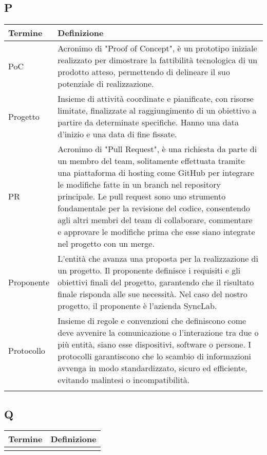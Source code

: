 \documentclass[10pt]{article}
\begin{document}
\subsection{P} %
\begin{tabularx}{\textwidth}{|>{\centering\arraybackslash}l|X|}
\hline
\rowcolor[gray]{0.8}
\textbf{Termine} & \textbf{Definizione}\\
\hline
PoC & Acronimo di "Proof of Concept", è un prototipo iniziale realizzato per dimostrare la fattibilità tecnologica di un prodotto atteso, permettendo di delineare il suo potenziale di realizzazione.\\
\hline
Progetto & Insieme di attività coordinate e pianificate, con risorse limitate, finalizzate al raggiungimento di un obiettivo a partire da determinate specifiche. Hanno una data d'inizio e una data di fine fissate.\\
\hline
PR & Acronimo di "Pull Request", è una richiesta da parte di un membro del team, solitamente effettuata tramite una piattaforma di hosting come GitHub per integrare le modifiche fatte in un branch nel repository principale. Le pull request sono uno strumento fondamentale per la revisione del codice, consentendo agli altri membri del team di collaborare, commentare e approvare le modifiche prima che esse siano integrate nel progetto con un merge.\\
\hline
Proponente & L'entità che avanza una proposta per la realizzazione di un progetto. Il proponente definisce i requisiti e gli obiettivi finali del progetto, garantendo che il risultato finale risponda alle sue necessità. Nel caso del nostro progetto, il proponente è l'azienda SyncLab.\\
\hline
Protocollo &  Insieme di regole e convenzioni che definiscono come deve avvenire la comunicazione o l'interazione tra due o più entità, siano esse dispositivi, software o persone. I protocolli garantiscono che lo scambio di informazioni avvenga in modo standardizzato, sicuro ed efficiente, evitando malintesi o incompatibilità.\\
\hline
 & \\
\hline
\end{tabularx}

\subsection{Q} %
\begin{tabularx}{\textwidth}{|>{\centering\arraybackslash}l|X|}
\hline
\rowcolor[gray]{0.8}
\textbf{Termine} & \textbf{Definizione}\\
\hline
 & \\
\hline
\end{tabularx}
\end{document}
